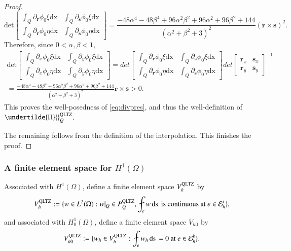 \documentclass[12pt,showkeys]{amsart}
\begin{document}
\begin{proof}
$$
\mathrm{det}\left[
\begin{array}{cc}
\displaystyle\int_Q\partial_{\mathbf{r}}\phi_0\xi{\mathrm{dx}} & \displaystyle\int_Q\partial_{\mathbf{s}}\phi_0 \xi{\mathrm{dx}}\\
\displaystyle\int_Q\partial_{\mathbf{r}}\phi_0\eta{\mathrm{dx}} & \displaystyle\int_Q\partial_{\mathbf{s}}\phi_0\eta{\mathrm{dx}}
\end{array}
\right]=\frac{-48\alpha^4-48\beta^4+96\alpha^2\beta^2+96\alpha^2+96\beta^2+144}{(\alpha^2+\beta^2+3)^2}({\mathbf{r}}\times{\mathbf{s}})^2.
$$
Therefore, since $0<\alpha,\beta<1$,
\begin{multline*}
\mathrm{det}\left[
\begin{array}{cc}
\displaystyle\int_Q\partial_x\phi_0\xi {\mathrm{dx}}& \displaystyle\int_Q\partial_y\phi_0 \xi{\mathrm{dx}}\\
\displaystyle\int_Q\partial_x\phi_0\eta{\mathrm{dx}} & \displaystyle\int_Q\partial_y\phi_0\eta{\mathrm{dx}}
\end{array}
\right] =
det\left[
\begin{array}{cc}
\displaystyle\int_Q\partial_{\mathbf{r}}\phi_0\xi{\mathrm{dx}} & \displaystyle\int_Q\partial_{\mathbf{s}}\phi_0 \xi{\mathrm{dx}}\\
\displaystyle\int_Q\partial_{\mathbf{r}}\phi_0\eta{\mathrm{dx}} & \displaystyle\int_Q\partial_{\mathbf{s}}\phi_0\eta{\mathrm{dx}}
\end{array}
\right]
det\left[
\begin{array}{cc}
{\mathbf{r}}_x & {\mathbf{s}}_x \\
{\mathbf{r}}_y & {\mathbf{s}}_y
\end{array}
\right]^{-1} \\ 
=\frac{-48\alpha^4-48\beta^4+96\alpha^2\beta^2+96\alpha^2+96\beta^2+144}{(\alpha^2+\beta^2+3)^2}{\mathbf{r}}\times{\mathbf{s}}>0.
\end{multline*}
This proves the well-posedness of \eqref{eq:divpres}, and thus the well-definition of $\undertilde{\Pi}{}_Q^{\rm QLTZ}$.

The remaining follows from the definition of the interpolation. This finishes the proof.
\end{proof}

\subsubsection{A finite element space for $H^1(\Omega)$}

Associated with $H^1(\Omega)$, define a finite element space $V_h^{\rm QLTZ}$ by
$$
V_h^{\rm QLTZ}:=\{w\in L^2(\Omega):w|_Q\in P_Q^{\rm QLTZ}, \fint_e w{\,\mathrm{ds}\,}\ \mbox{is\ continuous\ at}\ e\in\mathcal{E}_h^i\},
$$
and associated with $H^1_0(\Omega)$, define a finite element space $V_{h0}$ by
$$
V_{h0}^{\rm QLTZ}:=\{w_h\in V_h^{\rm QLTZ}:\fint_ew_h{\,\mathrm{ds}\,}=0\ \mbox{at\ }e\in \mathcal{E}_h^b\}.
$$
\end{document}
